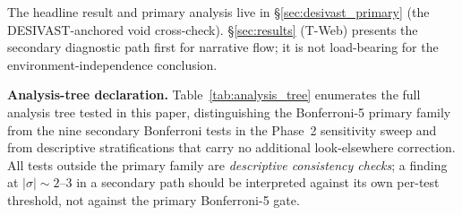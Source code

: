 \documentclass[aps,prd,twocolumn,superscriptaddress,showpacs,preprintnumbers,nofootinbib,longbibliography,floatfix]{revtex4-2}
\begin{document}
The headline result and primary analysis live
in \S\ref{sec:desivast_primary} (the DESIVAST-anchored void cross-check).
\S\ref{sec:results} (T-Web) presents the secondary diagnostic path first
for narrative flow; it is not load-bearing for the environment-independence
conclusion.

\textbf{Analysis-tree declaration.}
Table~\ref{tab:analysis_tree} enumerates the full analysis tree tested
in this paper, distinguishing the Bonferroni-5 primary family from the
nine secondary Bonferroni tests in the Phase~2 sensitivity sweep and
from descriptive stratifications that carry no additional look-elsewhere
correction. All tests outside the primary family are \emph{descriptive
consistency checks}; a finding at $|\sigma| \sim 2$--$3$ in a
secondary path should be interpreted against its own per-test threshold,
not against the primary Bonferroni-5 gate.
\end{document}
